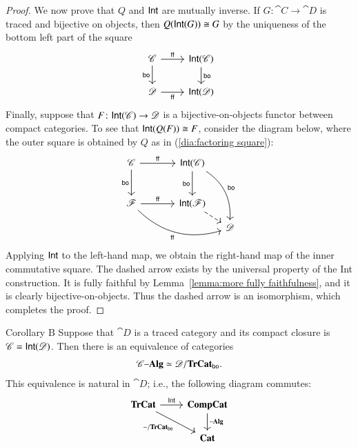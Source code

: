 \documentclass[12pt,oneside,article,draft]{memoir}
\begin{document}
\begin{proof}
We now prove that $Q$ and $\mathsf{Int}$ are mutually inverse. If $G\colon\cat{C}\to\cat{D}$ is traced and bijective on objects, then $Q(\mathsf{Int}(G))\cong G$ by the uniqueness of the bottom left part of the square
$$
\begin{tikzcd}
\cat{C}\arrow[r,"\ff"]\arrow[d,"\bo"']&\Int(\cat{C})\arrow[d,"\bo"]\\
\cat{D}\arrow[r,"\ff"']&\Int(\cat{D})
\end{tikzcd}
$$
Finally, suppose that $F\colon\mathsf{Int}(\mathscr{C})\to\mathscr{D}$ is a bijective-on-objects functor between compact categories. To see that $\mathsf{Int}(Q(F))\cong F$, consider the diagram below, where the outer square is obtained by $Q$ as in (\ref{dia:factoring square}):
$$
\begin{tikzcd}[column sep=small, row sep=small]
\cat{C}\arrow[rr,"\ff"]\arrow[dd,"\bo"']&~&\Int(\cat{C})\arrow[dd,"\bo"']\arrow[dddr,bend left,"\bo"]\\~\\
\cat{F}\arrow[rr,"\ff"]\arrow[drrr,bend right, "\ff"']&&\Int(\cat{F})\arrow[dr,dashed]\\
&&&\cat{D}
\end{tikzcd}
$$
Applying $\mathsf{Int}$ to the left-hand map, we obtain the right-hand map of the inner commutative square. The dashed arrow exists by the universal property of the Int construction. It is fully faithful by Lemma~\ref{lemma:more fully faithfulness}, and it is clearly bijective-on-objects. Thus the dashed arrow is an isomorphism, which completes the proof.


\end{proof}

 \begin{named}{Corollary B}\label{cor:Corollary B}
Suppose that $\cat{D}$ is a traced category and its compact closure is $\mathscr{C}=\mathsf{Int}(\mathscr{D})$. Then there is an equivalence of categories
\begin{align}\label{dia:traced lax strong}
\mathscr{C}{\text \textendash}\mathbf{Alg}\simeq\mathscr{D}/\mathbf{TrCat}_{\mathsf{bo}}.
\end{align}
This equivalence is natural in $\cat{D}$; i.e., the following diagram commutes:
\begin{equation*}
\begin{tikzcd}
\TrCat\ar[r,"\Fun{Int}"]\ar[dr,"-/\TrCat_{\bo}"']&\CompCat\ar[d,"\alg"]\\
&\Cat{Cat}
\end{tikzcd}
\end{equation*}
\end{named}
\end{document}
